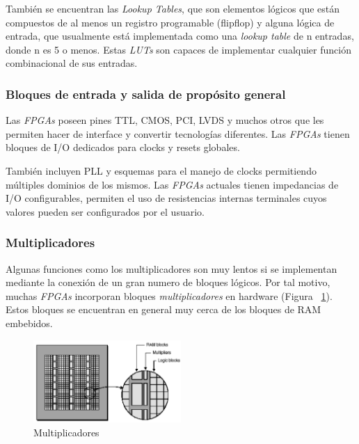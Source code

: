 También se encuentran las \textit{Lookup Tables}, que son elementos
lógicos que están compuestos de al menos un registro programable
(flip\-flop) y alguna lógica de entrada, que usualmente está
implementada como una \textit{lookup table} de n entradas, donde n es
5 o menos. Estas \textit{LUTs} son capaces de implementar cualquier
función combinacional de sus entradas.

\subsubsection{Bloques de entrada y salida de propósito general}

Las \textit{FPGAs} poseen pines TTL, CMOS, PCI, LVDS y muchos otros
que les permiten hacer de interface y convertir tecnologías
diferentes. Las \textit{FPGAs} tienen bloques de I/O dedicados para
clocks y resets globales.
	
También incluyen PLL y esquemas para el manejo de clocks permitiendo
múltiples dominios de los mismos. Las \textit{FPGAs} actuales tienen
impedancias de I/O configurables, permiten el uso de resistencias
internas terminales cuyos valores pueden ser configurados por el
usuario.

\subsubsection{Multiplicadores}

Algunas funciones como los multiplicadores son muy lentos si se
implementan mediante la conexión de un gran numero de bloques
lógicos. Por tal motivo, muchas \textit{FPGAs} incorporan bloques
\textit{multiplicadores} en hardware (Figura ~\ref{fig:mult}). Estos
bloques se encuentran en general muy cerca de los bloques de RAM
embebidos.

\begin{figure}[h!]
\begin{center}
\includegraphics[width=0.5\textwidth,keepaspectratio=true]{./images/multram}
\caption{Multiplicadores}
\label{fig:mult}
\end{center}
\end{figure}

